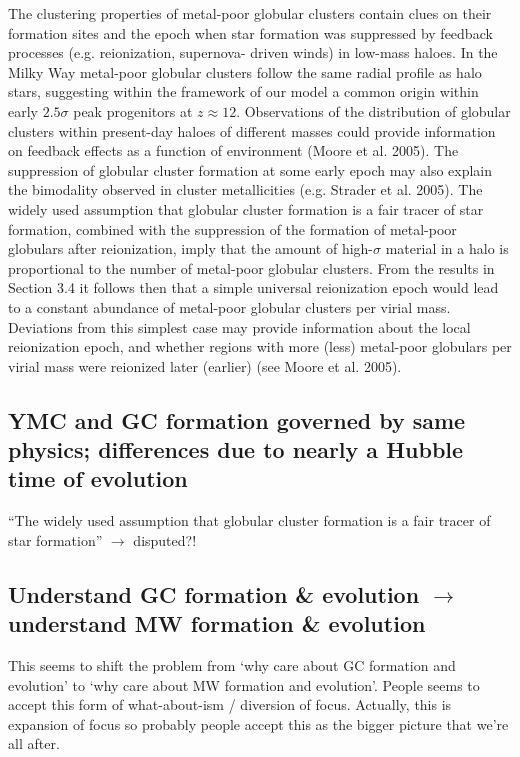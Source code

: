 \documentclass[a4paper,fleqn,usenatbib]{mnras}
\begin{document}
\begin{zitat}{\citet{2005MNRAS.364..367D}}
The  clustering  properties  of  metal-poor  globular  clusters  contain
clues on their formation sites and the epoch when star formation
was suppressed by feedback processes (e.g. reionization, supernova-
driven winds) in low-mass haloes. In the Milky Way metal-poor
globular clusters follow the same radial profile as halo stars, suggesting
within the framework of our model a common origin within
early $2.5\sigma$ peak progenitors at $z\approx12$. Observations of the
distribution of globular clusters within present-day haloes of different
masses could provide information on feedback effects as a function
of environment (Moore et al. 2005). The suppression of globular
cluster formation at some early epoch may also explain the bimodality 
observed in cluster metallicities (e.g. Strader et al. 2005). The
widely  used  assumption  that  globular  cluster  formation  is  a  fair
tracer of star formation, combined with the suppression of the formation  
of  metal-poor  globulars  after  reionization,  imply  that  the
amount of high-$\sigma$ material in a halo is proportional to the number of
metal-poor globular clusters. From the results in Section 3.4 it follows 
then that a simple universal reionization epoch would lead to a
constant abundance of metal-poor globular clusters per virial mass.
Deviations from this simplest case may provide information about
the local reionization epoch, and whether regions with more (less)
metal-poor globulars per virial mass were reionized later (earlier)
(see Moore et al. 2005).
\end{zitat}

\subsection{YMC and GC formation governed by same physics; differences 
due to nearly a Hubble time of evolution}
``The widely  used  assumption  that  globular  cluster  formation  is  a  fair
tracer of star formation'' $\rightarrow$ disputed?!


\subsection{Understand GC formation \& evolution $\rightarrow$ 
understand MW formation \& evolution}
This seems to shift the problem from `why care about GC formation and evolution'
to `why care about MW formation and evolution'. People seems to accept this
form of what-about-ism / diversion of focus. Actually, this is expansion of focus
so probably people accept this as the bigger picture that we're all after.
\end{document}
